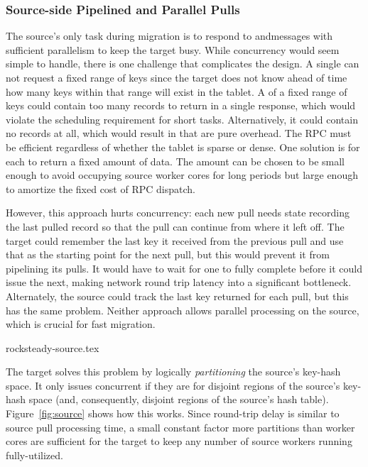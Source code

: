 \subsubsection{Source-side Pipelined and Parallel Pulls}
\label{sec:source}
The source's only task during migration is to respond
to \pull and\linebreak{}\priopull messages with sufficient parallelism to
keep the target busy. While concurrency would seem
simple to handle, there is one challenge that complicates the design.
A single \pull can not request a fixed range of keys since the target does not know
ahead of time how many keys within that range will exist in the tablet. A \pull of a fixed range of keys
could contain too many records to return in a single response, which would violate
the scheduling requirement for short tasks. Alternatively, it could contain no
records at all, which would result in \pulls that are pure overhead.
The \pull RPC must be efficient
regardless of whether the tablet is sparse or dense. One solution is for each
\pull to return a fixed amount of data. The amount can be chosen to be small
enough to avoid occupying source worker cores for long periods but large
enough to amortize the fixed cost of RPC dispatch.

However, this approach hurts concurrency:  each new pull needs state recording
the last pulled record so that the pull can continue from where it left off.
The target could remember the last key it received from the previous pull and
use that as the starting point for the next pull, but this would prevent it
from pipelining its pulls.
It would have to wait for one to fully complete before it could
issue the next, making network round trip latency into a significant bottleneck.
Alternately, the source could track
the last key returned for each pull, but this has the same problem.  Neither
approach allows parallel \pull processing on the source, which is
crucial for fast migration.

 {rocksteady-source.tex}

The target solves this problem by logically {\em partitioning} the source's key-hash
space. It only issues concurrent \pulls if they are for disjoint regions of the
source's key-hash space (and, consequently, disjoint regions of the source's
hash table).  Figure~\ref{fig:source} shows how this works.
Since round-trip delay is similar to source pull processing time,
a small constant factor more partitions than worker cores are sufficient for the
target to keep any number of source workers running fully-utilized.

